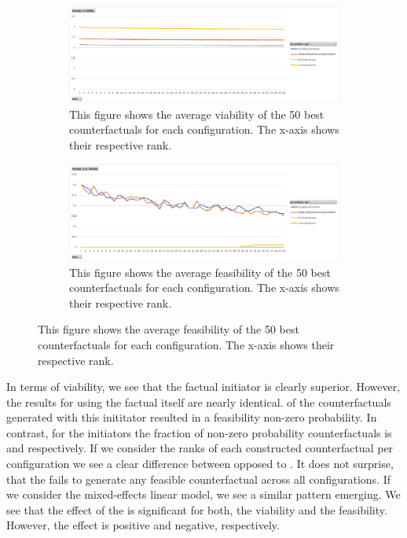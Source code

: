 \documentclass[./../../paper.tex]{subfiles}
\begin{document}
\begin{figure}
    \centering
    \begin{subfigure}[c]{0.99\textwidth}
        \centering
        \includegraphics[width=\textwidth]{figures/plots/average_viability.png}
        \caption{This figure shows the average viability of the 50 best counterfactuals for each configuration. The x-axis shows their respective rank.}
        \label{fig:average_viability}
    \end{subfigure}
    \begin{subfigure}[c]{0.99\textwidth}
        \centering
        \includegraphics[width=\textwidth]{figures/plots/average_feasibility.png}
        \caption{This figure shows the average feasibility of the 50 best counterfactuals for each configuration. The x-axis shows their respective rank.}
        \label{fig:average_feasibility}
    \end{subfigure}
\end{figure}




In terms of viability, we see that the factual initiator is clearly superior. However, the results for using the factual itself are nearly identical.   of the counterfactuals generated with this inititator resulted in a feasibility non-zero probability. In contrast, for the   initiators the fraction of non-zero probability counterfactuals is  and  respectively. If we consider the ranks of each constructed counterfactual per configuration we see a clear difference between  opposed to . It does not surprise, that the  fails to generate any feasible counterfactual across all configurations. If we consider the mixed-effects linear model, we see a similar pattern emerging. We see that the effect of the  is significant for both, the viability and the feasibility. However, the effect is positive and negative, respectively. 
\end{document}
